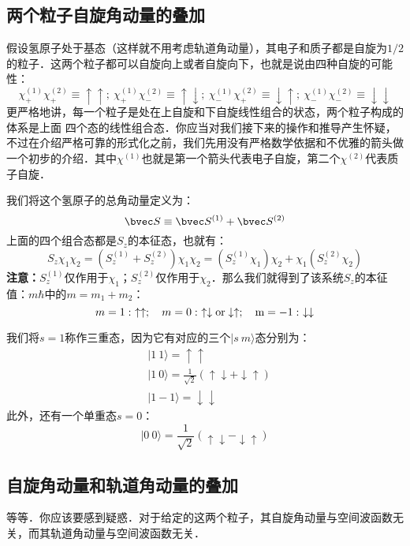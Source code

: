 
\subsection{两个粒子自旋角动量的叠加}
假设氢原子处于基态（这样就不用考虑轨道角动量），其电子和质子都是自旋为$1/2$的粒子．这两个粒子都可以自旋向上或者自旋向下，也就是说由四种自旋的可能性：
\begin{equation}
\chi^{(1)}_+\chi^{(2)}_+\equiv\uparrow\uparrow;\ \chi^{(1)}_+\chi^{(2)}_-\equiv\uparrow\downarrow;\ \chi^{(1)}_-\chi^{(2)}_+\equiv\downarrow\uparrow;\ \chi^{(1)}_-\chi^{(2)}_-\equiv\downarrow\downarrow
\end{equation}
更严格地讲，每一个粒子是处在上自旋和下自旋线性组合的状态，两个粒子构成的体系是上面
四个态的线性组合态．你应当对我们接下来的操作和推导产生怀疑，不过在介绍严格可靠的形式化之前，我们先用没有严格数学依据和不优雅的箭头做一个初步的介绍．其中$\chi^{(1)}$也就是第一个箭头代表电子自旋，第二个$\chi^{(2)}$代表质子自旋．

我们将这个氢原子的总角动量定义为：
\begin{equation}
\bvec S \equiv \bvec S^{(1)}+\bvec S^{(2)}
\end{equation}
上面的四个组合态都是$S_z$的本征态，也就有：
\begin{equation}
S_z\chi_1\chi_2=(S_z^{(1)}+S_z^{(2)})\chi_1\chi_2=(S_z^{(1)}\chi_1)\chi_2+\chi_1(S_z^{(2)}\chi_2)
\end{equation}
\textbf{注意：}$S_z^{(1)}$仅作用于$\chi_1$；$S_z^{(2)}$仅作用于$\chi_2$．那么我们就得到了该系统$S_z$的本征值：$m\hbar$中的$m=m_1+m_2$：
\begin{equation}
m=1: \ \uparrow\uparrow;\quad m=0: \ \uparrow\downarrow \rm{or} \downarrow\uparrow;\quad m=-1:\ \downarrow\downarrow
\end{equation}

我们将$s=1$称作三重态，因为它有对应的三个$|s\ m\rangle$态分别为：
\begin{align}
&|1 \ 1\rangle =\uparrow\uparrow\\
&|1 \ 0\rangle=\frac{1}{\sqrt{2}}(\uparrow\downarrow+\downarrow\uparrow)\\
&|1 -1\rangle=\downarrow\downarrow
\end{align}
此外，还有一个单重态$s=0$：
\begin{equation}
|0\ 0\rangle = \frac{1}{\sqrt{2}}(\uparrow\downarrow-\downarrow\uparrow)
\end{equation}

\subsection{自旋角动量和轨道角动量的叠加}
等等．你应该要感到疑惑．对于给定的这两个粒子，其自旋角动量与空间波函数无关，而其轨道角动量与空间波函数无关．
